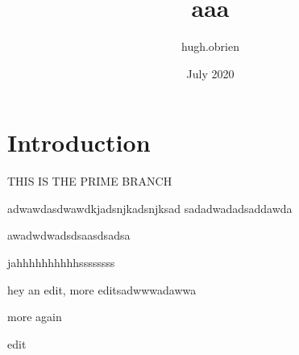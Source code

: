 \documentclass{article}
\title{aaa}
\author{hugh.obrien }
\date{July 2020}
\begin{document}
\maketitle

\section{Introduction}

THIS IS THE PRIME BRANCH

adwawdasdwawdkjadsnjkadsnjksad
sadadwadadsaddawda

awadwdwadsdsaasdsadsa

jahhhhhhhhhhssssssss

hey an edit, more editsadwwwadawwa

more again

edit
\end{document}
